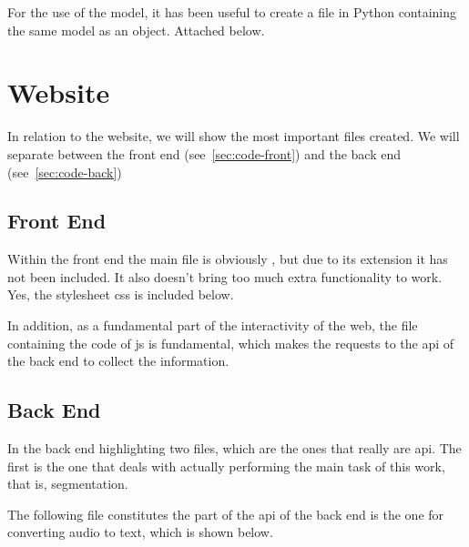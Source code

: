 
For the use of the model, it has been useful to create a file in Python
containing the same model as an object. Attached below.




\section{Website}\label{sec:code-web}

In relation to the website, we will show the most important files created. We
will separate between the front end (see\ \vref{sec:code-front}) and the back
end (see\ \vref{sec:code-back})

\subsection{Front End}\label{sec:code-front}

Within the front end the main file is obviously , but due to
its extension it has not been included. It also doesn't bring too much extra
functionality to work. Yes, the stylesheet \acs{css} is included below.


In addition, as a fundamental part of the interactivity of the web, the file
containing the code of \acs{js} is fundamental, which makes the requests to the
\gls{api} of the back end to collect the information.



\subsection{Back End}\label{sec:code-back}

In the back end highlighting two files, which are the ones that really are
\gls{api}. The first is the one that deals with actually performing the main
task of this work, that is, segmentation.


The following file constitutes the part of the \gls{api} of the back end is the
one for converting audio to text, which is shown below.


